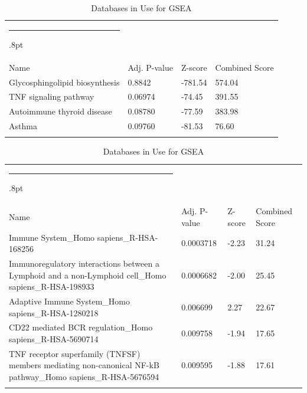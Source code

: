 \documentclass[3p,authoryear,preprint,12pt]{elsarticle}
\makeatletter
\def\hlinewd#1{%
  \noalign{\ifnum0=`}\fi\hrule \@height #1%
  \futurelet\reserved@a\@xhline}
\def\tbltoprule{\hlinewd{.8pt}\\[-12pt]}
\def\tblbottomrule{\noalign{\vspace*{6pt}}\hline\noalign{\vspace*{2pt}}}
\def\tblmidrule{\noalign{\vspace*{6pt}}\hline\noalign{\vspace*{2pt}}}
\makeatother
\begin{document}
\begin{table}[!htbp]
	\caption{{Databases in Use for GSEA} }
	\label{tw-de478ae31cc6}
	\def\arraystretch{1}
	\ignorespaces 
	\centering 
	\begin{tabulary}{\linewidth}{p{\dimexpr.65\tabcolsep}p{\dimexpr.15\tabcolsep}p{\dimexpr.1\tabcolsep}p{\dimexpr.1\tabcolsep}}
		\tbltoprule Name & Adj. P-value & Z-score & Combined Score\\
		\tblmidrule
Glycosphingolipid biosynthesis & 0.8842 & -781.54 & 574.04 \\
TNF signaling pathway & 0.06974 & -74.45 & 391.55 \\
Autoimmune thyroid disease & 0.08780 & -77.59 & 383.98 \\
Asthma & 0.09760 & -81.53 & 76.60 \\
		\tblbottomrule
	\end{tabulary}\par 
\end{table}
\begin{table}[!htbp]
	\caption{{Databases in Use for GSEA} }
	\label{tw-de478ae31cc6}
	\def\arraystretch{1}
	\ignorespaces 
	\centering 
	\begin{tabulary}{\linewidth}{p{\dimexpr.65\tabcolsep}p{\dimexpr.15\tabcolsep}p{\dimexpr.1\tabcolsep}p{\dimexpr.1\tabcolsep}}
		\tbltoprule Name & Adj. P-value & Z-score & Combined Score\\
		\tblmidrule
Immune System\_Homo sapiens\_R-HSA-168256 & 0.0003718 & -2.23 & 31.24 \\
Immunoregulatory interactions between a Lymphoid and a non-Lymphoid cell\_Homo sapiens\_R-HSA-198933 & 0.0006682 & -2.00 & 25.45 \\
Adaptive Immune System\_Homo sapiens\_R-HSA-1280218 & 0.006699 & 2.27 & 22.67 \\
CD22 mediated BCR regulation\_Homo sapiens\_R-HSA-5690714 & 0.009758 & -1.94 & 17.65 \\
TNF receptor superfamily (TNFSF) members mediating non-canonical NF-kB pathway\_Homo sapiens\_R-HSA-5676594 & 0.009595 & -1.88 & 17.61 \\
		\tblbottomrule
	\end{tabulary}\par 
\end{table}
\end{document}

